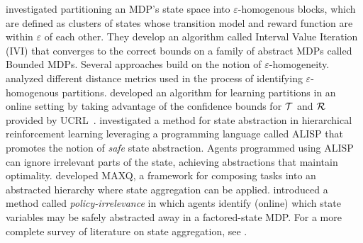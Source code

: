 \citet{dean1997model} investigated partitioning an \ac{MDP}'s state space into $\varepsilon$-homogenous blocks, which are defined as clusters of states whose transition model and reward function are within $\varepsilon$ of each other. They develop an algorithm called Interval Value Iteration (IVI) that converges to the correct bounds on a family of abstract MDPs called Bounded \acp{MDP}. Several approaches build on the notion of $\varepsilon$-homogeneity. \citet{even2003approximate} analyzed different distance metrics used in the process of identifying $\varepsilon$-homogenous partitions. \citet{ortner2013adaptive} developed an algorithm for learning partitions in an online setting by taking advantage of the confidence bounds for $\mathcal{T}$ and $\mathcal{R}$ provided by UCRL~\cite{auer2009near}. \citet{andre2002state} investigated a method for state abstraction in hierarchical reinforcement learning leveraging a programming language called ALISP that promotes the notion of {\it safe} state abstraction. Agents programmed using ALISP can ignore irrelevant parts of the state, achieving abstractions that maintain optimality. \citet{dietterich2000hierarchical} developed MAXQ, a framework for composing tasks into an abstracted hierarchy where state aggregation can be applied. \citet{jong2005state} introduced a method called {\it policy-irrelevance} in which agents identify (online) which state variables may be safely abstracted away in a factored-state \ac{MDP}. For a more complete survey of literature on state aggregation, see \citet{li2006towards}.




